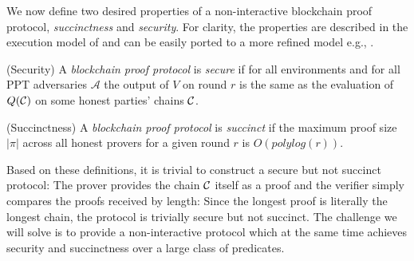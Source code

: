 

\medskip
{}
We now define two desired properties of a non-interactive blockchain proof protocol, \textit{succinctness} and \textit{security}. For clarity, the properties are described in the execution model of \cite{backbone} and can be easily ported to a more refined model e.g., \cite{PSS}.

\begin{definition}{(Security)}
A \textit{blockchain proof protocol} is \textit{secure} if for all environments
and for all PPT adversaries $\mathcal{A}$ the output of $V$ on round $r$ is the
same as the evaluation of $Q(\mathcal{C})$ on some honest parties' chains $\mathcal{C}$.
\end{definition}

\begin{definition}{(Succinctness)}
A \textit{blockchain proof protocol} is \textit{succinct} if the maximum proof
size $|\pi|$ across all honest provers for a given round $r$ is
$O(polylog(r))$.
\end{definition}

Based on these definitions, it is trivial to construct a secure but not succinct
protocol: The prover provides the chain $\mathcal{C}$ itself as a proof and the
verifier simply compares the proofs received by length: Since the longest proof
is literally the longest chain, the protocol is trivially secure but not
succinct. The challenge we will solve is to provide a
non-interactive protocol which at the same time achieves security and
succinctness over a large class of predicates.
